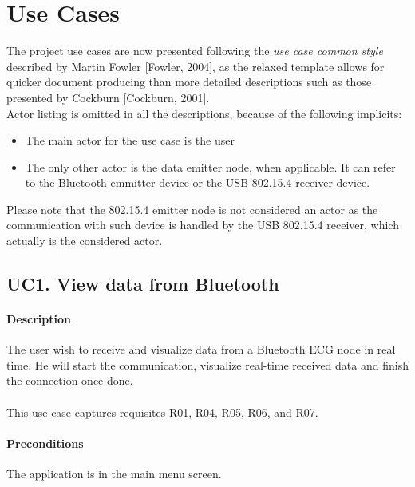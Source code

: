 	
	\section{Use Cases}

		The project use cases are now presented following the \emph{use case common style} described by Martin Fowler [Fowler, 2004], as the relaxed template allows for quicker document producing than more detailed descriptions such as those presented by Cockburn [Cockburn, 2001].\\

		Actor listing is omitted in all the descriptions, because of the following implicits:
		\begin{itemize}
			\item The main actor for the use case is the user
			\item The only other actor is the data emitter node, when applicable. It can refer to the Bluetooth emmitter device or the USB 802.15.4 receiver device.
		\end{itemize}
		Please note that the 802.15.4 emitter node is not considered an actor as the communication with such device is handled by the USB 802.15.4 receiver, which actually is the considered actor.

		\subsection{UC1. View data from Bluetooth}

			\paragraph{Description} The user wish to receive and visualize data from a Bluetooth ECG node in real time. He will start the communication, visualize real-time received data and finish the connection once done.\\
			\\This use case captures requisites R01, R04, R05, R06, and R07.

			\paragraph{Preconditions} The application is in the main menu screen.
